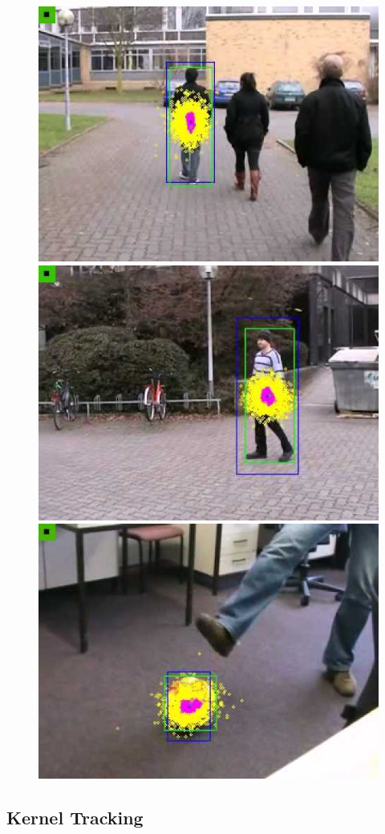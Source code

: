 \begin{figure}[t!!]
\centering
{
\includegraphics[width=0.32\linewidth]{Figures/particle_filter1.jpg}
\includegraphics[width=0.32\linewidth]{Figures/particle_filter2.jpg}
\includegraphics[width=0.32\linewidth]{Figures/particle_filter3.jpg}
}	
\end{figure}


\subsection{Kernel Tracking}

